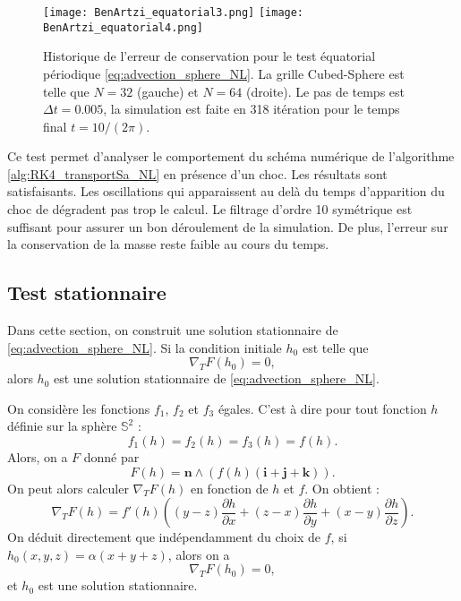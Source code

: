 \begin{figure}[htbp]
\begin{center}
\texttt{[image: BenArtzi\_equatorial3.png]}
\texttt{[image: BenArtzi\_equatorial4.png]}
\end{center}
\caption{Historique de l'erreur de conservation pour le test équatorial périodique \eqref{eq:advection_sphere_NL}. La grille Cubed-Sphere est telle que $N=32$ (gauche) et $N=64$ (droite). Le pas de temps est $\Delta t = 0.005$, la simulation est faite en 318 itération pour le temps final $t=10/(2\pi)$.}
\label{fig:BenArtzi_equatorial3}
\end{figure} 

Ce test permet d'analyser le comportement du schéma numérique de l'algorithme \ref{alg:RK4_transportSa_NL} en présence d'un choc. Les résultats sont satisfaisants. Les oscillations qui apparaissent au delà du temps d'apparition du choc de dégradent pas trop le calcul. Le filtrage d'ordre 10 symétrique est suffisant pour assurer un bon déroulement de la simulation. De plus, l'erreur sur la conservation de la masse reste faible au cours du temps.





















\subsection{Test stationnaire}

Dans cette section, on construit une solution stationnaire de \eqref{eq:advection_sphere_NL}. Si la condition initiale $h_0$ est telle que
\begin{equation}
\nabla_T F(h_0) = 0,
\end{equation}
alors $h_0$ est une solution stationnaire de \eqref{eq:advection_sphere_NL}.

On considère les fonctions $f_1$, $f_2$ et $f_3$ égales. C'est à dire pour tout fonction $h$ définie sur la sphère $\mathbb{S}^2$ :
\begin{equation}
f_1(h) = f_2(h) = f_3(h) = f(h).
\end{equation}
Alors, on a $F$ donné par
\begin{equation}
F(h) = \mathbf{n} \wedge \left( f(h) (\mathbf{i}+\mathbf{j}+\mathbf{k}) \right).
\end{equation}
On peut alors calculer $\nabla_T F(h)$ en fonction de $h$ et $f$. On obtient :
\begin{equation}
\nabla_T F(h) = f'(h) \left( (y-z)\dfrac{\partial h}{\partial x} + (z-x)\dfrac{\partial h}{\partial y} + (x-y)\dfrac{\partial h}{\partial z} \right).
\end{equation}
On déduit directement que indépendamment du choix de $f$, si $h_0(x,y,z) = \alpha (x+y+z)$, alors on a
\begin{equation}
\nabla_T F(h_0) = 0,
\end{equation}
et $h_0$ est une solution stationnaire.

